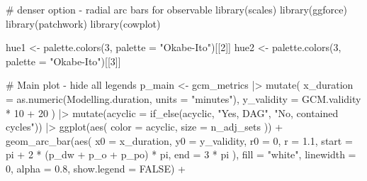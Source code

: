 \documentclass[
  letterpaper,
  DIV=11,
  numbers=noendperiod]{scrartcl}
\newenvironment{Shaded}{\begin{snugshade}}{\end{snugshade}}
\newcommand{\AttributeTok}[1]{\textcolor[rgb]{0.40,0.45,0.13}{#1}}
\newcommand{\CommentTok}[1]{\textcolor[rgb]{0.37,0.37,0.37}{#1}}
\newcommand{\ConstantTok}[1]{\textcolor[rgb]{0.56,0.35,0.01}{#1}}
\newcommand{\DecValTok}[1]{\textcolor[rgb]{0.68,0.00,0.00}{#1}}
\newcommand{\FloatTok}[1]{\textcolor[rgb]{0.68,0.00,0.00}{#1}}
\newcommand{\FunctionTok}[1]{\textcolor[rgb]{0.28,0.35,0.67}{#1}}
\newcommand{\NormalTok}[1]{\textcolor[rgb]{0.00,0.23,0.31}{#1}}
\newcommand{\OtherTok}[1]{\textcolor[rgb]{0.00,0.23,0.31}{#1}}
\newcommand{\SpecialCharTok}[1]{\textcolor[rgb]{0.37,0.37,0.37}{#1}}
\newcommand{\StringTok}[1]{\textcolor[rgb]{0.13,0.47,0.30}{#1}}
\begin{document}
\begin{Shaded}
\begin{Highlighting}[]
\CommentTok{\# denser option {-} radial arc bars for observable}
\FunctionTok{library}\NormalTok{(scales)}
\FunctionTok{library}\NormalTok{(ggforce)}
\FunctionTok{library}\NormalTok{(patchwork)}
\FunctionTok{library}\NormalTok{(cowplot)}

\NormalTok{hue1 }\OtherTok{\textless{}{-}} \FunctionTok{palette.colors}\NormalTok{(}\DecValTok{3}\NormalTok{, }\AttributeTok{palette =} \StringTok{"Okabe{-}Ito"}\NormalTok{)[[}\DecValTok{2}\NormalTok{]]}
\NormalTok{hue2 }\OtherTok{\textless{}{-}} \FunctionTok{palette.colors}\NormalTok{(}\DecValTok{3}\NormalTok{, }\AttributeTok{palette =} \StringTok{"Okabe{-}Ito"}\NormalTok{)[[}\DecValTok{3}\NormalTok{]]}

\CommentTok{\# Main plot {-} hide all legends}
\NormalTok{p\_main }\OtherTok{\textless{}{-}}\NormalTok{ gcm\_metrics }\SpecialCharTok{|\textgreater{}} 
    \FunctionTok{mutate}\NormalTok{(}
        \AttributeTok{x\_duration =} \FunctionTok{as.numeric}\NormalTok{(Modelling.duration, }\AttributeTok{units =} \StringTok{"minutes"}\NormalTok{),}
        \AttributeTok{y\_validity =}\NormalTok{ GCM.validity }\SpecialCharTok{*} \DecValTok{10} \SpecialCharTok{+} \DecValTok{20}
\NormalTok{    ) }\SpecialCharTok{|\textgreater{}} 
    \FunctionTok{mutate}\NormalTok{(}\AttributeTok{acyclic =} \FunctionTok{if\_else}\NormalTok{(acyclic, }\StringTok{"Yes, DAG"}\NormalTok{, }\StringTok{"No, contained cycles"}\NormalTok{)) }\SpecialCharTok{|\textgreater{}} 
    \FunctionTok{ggplot}\NormalTok{(}\FunctionTok{aes}\NormalTok{(}
        \AttributeTok{color =}\NormalTok{ acyclic,}
        \AttributeTok{size =}\NormalTok{ n\_adj\_sets}
\NormalTok{    )) }\SpecialCharTok{+}
    \FunctionTok{geom\_arc\_bar}\NormalTok{(}\FunctionTok{aes}\NormalTok{(}
        \AttributeTok{x0 =}\NormalTok{ x\_duration,}
        \AttributeTok{y0 =}\NormalTok{ y\_validity,}
        \AttributeTok{r0 =} \DecValTok{0}\NormalTok{,}
        \AttributeTok{r =} \FloatTok{1.1}\NormalTok{,}
        \AttributeTok{start =}\NormalTok{ pi }\SpecialCharTok{+} \DecValTok{2} \SpecialCharTok{*}\NormalTok{ (p\_dw }\SpecialCharTok{+}\NormalTok{ p\_o }\SpecialCharTok{+}\NormalTok{ p\_po) }\SpecialCharTok{*}\NormalTok{ pi,}
        \AttributeTok{end =} \DecValTok{3} \SpecialCharTok{*}\NormalTok{ pi}
\NormalTok{    ),}
        \AttributeTok{fill =} \StringTok{"white"}\NormalTok{,}
        \AttributeTok{linewidth =} \DecValTok{0}\NormalTok{,}
    \AttributeTok{alpha =} \FloatTok{0.8}\NormalTok{, }\AttributeTok{show.legend =} \ConstantTok{FALSE}\NormalTok{) }\SpecialCharTok{+}

\end{Highlighting}
\end{Shaded}
\end{document}
